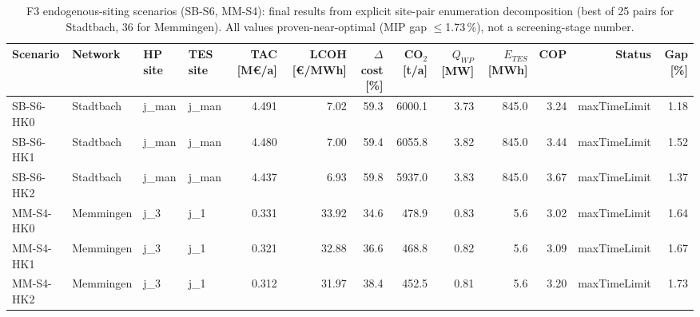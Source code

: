 \begin{table}[htbp]
\centering
\caption{F3 endogenous-siting scenarios (SB-S6, MM-S4): final results from explicit
site-pair enumeration decomposition (best of 25 pairs for Stadtbach, 36 for
Memmingen). All values proven-near-optimal (MIP gap $\leq$1.73\,\%), not a
screening-stage number.}
\label{tab:t3b_t4b_f3_final}
\begin{tabular}{llllrrrrrrrrr}
\toprule
Scenario & Network & HP site & TES site & TAC [M€/a] & LCOH [€/MWh] & $\Delta$cost [\%] & CO$_2$ [t/a] & $Q_{WP}$ [MW] & $E_{TES}$ [MWh] & COP & Status & Gap [\%] \\
\midrule
SB-S6-HK0 & Stadtbach & j\_man & j\_man & 4.491 & 7.02 & 59.3 & 6000.1 & 3.73 & 845.0 & 3.24 & maxTimeLimit & 1.18 \\
SB-S6-HK1 & Stadtbach & j\_man & j\_man & 4.480 & 7.00 & 59.4 & 6055.8 & 3.82 & 845.0 & 3.44 & maxTimeLimit & 1.52 \\
SB-S6-HK2 & Stadtbach & j\_man & j\_man & 4.437 & 6.93 & 59.8 & 5937.0 & 3.83 & 845.0 & 3.67 & maxTimeLimit & 1.37 \\
MM-S4-HK0 & Memmingen & j\_3 & j\_1 & 0.331 & 33.92 & 34.6 & 478.9 & 0.83 & 5.6 & 3.02 & maxTimeLimit & 1.64 \\
MM-S4-HK1 & Memmingen & j\_3 & j\_1 & 0.321 & 32.88 & 36.6 & 468.8 & 0.82 & 5.6 & 3.09 & maxTimeLimit & 1.67 \\
MM-S4-HK2 & Memmingen & j\_3 & j\_1 & 0.312 & 31.97 & 38.4 & 452.5 & 0.81 & 5.6 & 3.20 & maxTimeLimit & 1.73 \\
\bottomrule
\end{tabular}
\end{table}
